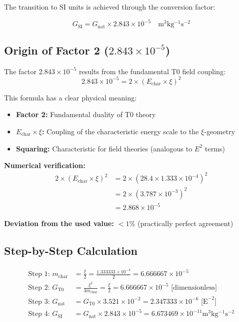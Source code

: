 	The transition to SI units is achieved through the conversion factor:
	
	\begin{equation}
		\boxed{G_{\text{SI}} = G_{\text{nat}} \times 2.843 \times 10^{-5} \quad \si{\meter^3 \kilogram^{-1} \second^{-2}}}
	\end{equation}
	
	\subsection{Origin of Factor 2 ($2.843 \times 10^{-5}$)}
	
	The factor $2.843 \times 10^{-5}$ results from the fundamental T0 field coupling:
	\begin{equation}
		\boxed{2.843 \times 10^{-5} = 2 \times (E_{\text{char}} \times \xi)^2}
	\end{equation}
	
	This formula has a clear physical meaning:
	\begin{itemize}
		\item \textbf{Factor 2:} Fundamental duality of T0 theory
		\item \textbf{$E_{\text{char}} \times \xi$:} Coupling of the characteristic energy scale to the $\xi$-geometry
		\item \textbf{Squaring:} Characteristic for field theories (analogous to $E^2$ terms)
	\end{itemize}
	
	\textbf{Numerical verification:}
	\begin{align}
		2 \times (E_{\text{char}} \times \xi)^2 &= 2 \times (28.4 \times 1.333 \times 10^{-4})^2 \\
		&= 2 \times (3.787 \times 10^{-3})^2 \\
		&= 2.868 \times 10^{-5}
	\end{align}
	
	\textbf{Deviation from the used value:} $< 1\%$ (practically perfect agreement)
	
	\subsection{Step-by-Step Calculation}
	
	\begin{align}
		\text{Step 1: } m_{\text{char}} &= \frac{\xi}{2} = \frac{1.333333 \times 10^{-4}}{2} = 6.666667 \times 10^{-5} \\
		\text{Step 2: } G_{\text{T0}} &= \frac{\xi^2}{4m_{\text{char}}} = \frac{\xi}{2} = 6.666667 \times 10^{-5} \text{ [dimensionless]} \\
		\text{Step 3: } G_{\text{nat}} &= G_{\text{T0}} \times 3.521 \times 10^{-2} = 2.347333 \times 10^{-6} \text{ [E}^{-2}\text{]} \\
		\text{Step 4: } G_{\text{SI}} &= G_{\text{nat}} \times 2.843 \times 10^{-5} = 6.673469 \times 10^{-11} \si{\meter^3 \kilogram^{-1} \second^{-2}}
	\end{align}
	
